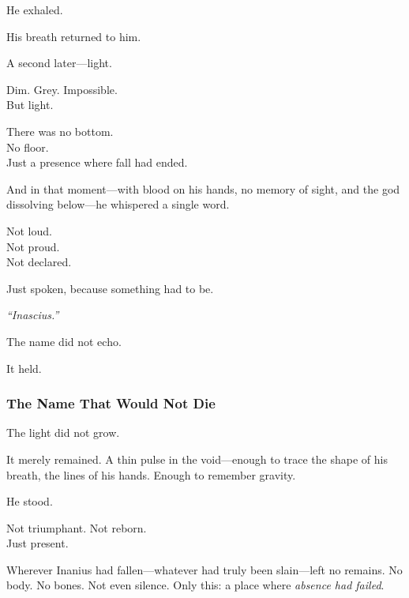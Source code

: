 \documentclass[12pt]{article}
\begin{document}
\vspace{0.5em}
He exhaled.

\vspace{0.5em}
His breath returned to him.

\vspace{0.5em}
A second later---light.

\vspace{0.5em}
Dim. Grey. Impossible.\\
But light.

\vspace{0.5em}
There was no bottom.\\
No floor.\\
Just a presence where fall had ended.

\vspace{0.5em}
And in that moment---with blood on his hands, no memory of sight, and the god dissolving below---he whispered a single word.

\vspace{0.5em}
Not loud.\\
Not proud.\\
Not declared.

\vspace{0.5em}
Just spoken, because something had to be.

\vspace{0.5em}
\textit{``Inascius.''}

\vspace{0.5em}
The name did not echo.

\vspace{0.5em}
It held.

\dotfill

\subsubsection{The Name That Would Not Die}

The light did not grow.

\vspace{0.5em}
It merely remained. A thin pulse in the void---enough to trace the shape of his breath, the lines of his hands. Enough to remember gravity.

\vspace{0.5em}
He stood.

\vspace{0.5em}
Not triumphant. Not reborn.\\
Just present.

\vspace{0.5em}
Wherever Inanius had fallen---whatever had truly been slain---left no remains. No body. No bones. Not even silence. Only this: a place where \textit{absence had failed}.
\end{document}
